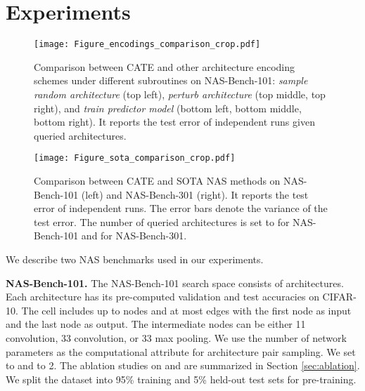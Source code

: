 \section{Experiments}
\label{sec.experiments} 


\begin{figure*}[t]
	\centering
	\texttt{[image: Figure\_encodings\_comparison\_crop.pdf]}
\caption{Comparison between CATE and other architecture encoding schemes under different subroutines on NAS-Bench-101: \emph{sample random architecture} (top left), \emph{perturb architecture} (top middle, top right), and \emph{train predictor model}
(bottom left, bottom middle, bottom right). It reports the test error of  independent runs given  queried architectures.}
	\label{fig.nas_encodings_comprison}
\end{figure*}

\begin{figure*}[t]
	\centering
	\texttt{[image: Figure\_sota\_comparison\_crop.pdf]}
\caption{Comparison between CATE and SOTA NAS methods on NAS-Bench-101 (left) and NAS-Bench-301 (right). It reports the test error of  independent runs. The error bars denote the variance of the test error. The number of queried architectures is set to  for NAS-Bench-101 and  for NAS-Bench-301.}
	\label{fig.nas_sota_comprison}
\end{figure*}

We describe two NAS benchmarks used in our experiments.

\textbf{NAS-Bench-101.}
The NAS-Bench-101 search space \cite{pmlr-v97-ying19a} consists of   architectures. Each architecture has its pre-computed validation and test accuracies on CIFAR-10. The cell includes up to  nodes and at most  edges with the first node as input and the last node as output. The intermediate nodes can be either 11 convolution, 33 convolution, or 33 max pooling. We use the number of network parameters as the computational attribute  for architecture pair sampling. We set  to  and  to 2. The ablation studies on  and  are summarized in Section \ref{sec:ablation}. We split the dataset into 95\% training and 5\% held-out test sets for pre-training.

